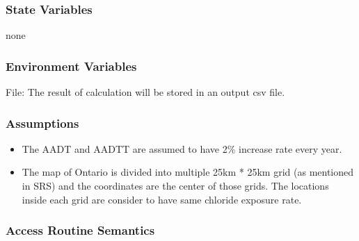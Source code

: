 \documentclass[12pt, titlepage]{article}
\begin{document}
\subsubsection{State Variables}
none

\subsubsection{Environment Variables}

File: The result of calculation will be stored in an output csv file.

\subsubsection{Assumptions}

\begin{itemize}
\item The AADT and AADTT are assumed to have 2\% increase rate every year.
\item The map of Ontario is divided into multiple 25km * 25km grid (as mentioned in SRS) and the coordinates are the center of those grids. The locations inside each grid are consider to have same chloride exposure rate.
\end{itemize}

\subsubsection{Access Routine Semantics}
\end{document}
